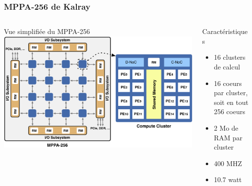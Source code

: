 \documentclass[10pt]{beamer}
\newcommand{\mppa}{{\small \textsf{MPPA-256}}\xspace}
\begin{document}
\begin{frame}
\frametitle{MPPA-256 de Kalray}
  \begin{columns}[T]
    \begin{column}{.55\textwidth}
    \begin{block}{Vue simplifiée du \mppa}
    \includegraphics[scale=0.26]{figures/mppa_overall}
    \end{block}
    \end{column}
    \begin{column}{.4\textwidth}
     \begin{block}{Caractéristiques}
      \begin{itemize}
       \item 16 clusters de calcul
       \item 16 coeurs par cluster, soit en tout 256 coeurs
       \item 2 Mo de RAM par cluster
       \item 400 MHZ
       \item 10.7 watt
      \end{itemize}
     \end{block}
    \end{column}
  \end{columns}
\end{frame}
\end{document}
